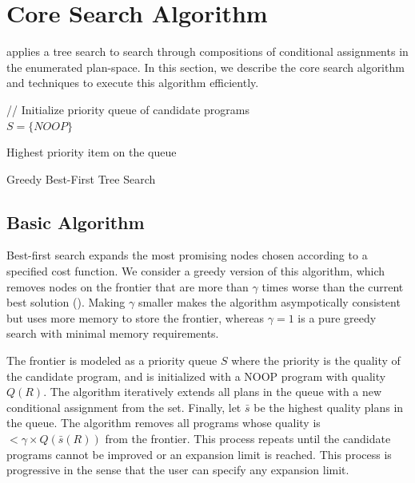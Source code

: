 \section{Core Search Algorithm}
\sys applies a tree search to search through compositions of conditional assignments in the enumerated plan-space. In this section, we describe the core search algorithm and techniques to execute this algorithm efficiently.

{
\begin{algorithm}[t]

// Initialize priority queue of candidate programs\\
$S = \{NOOP\}$



\Return Highest priority item on the queue
\caption{Greedy Best-First Tree Search}
\label{alg:main}
\end{algorithm}
}

\subsection{Basic Algorithm}
Best-first search expands the most promising nodes chosen according to a specified cost function.
We consider a greedy version of this algorithm, which removes nodes on the frontier that are more than $\gamma$ times worse than the current best solution ().
Making $\gamma$ smaller makes the algorithm asympotically consistent but uses more memory to store the frontier, whereas $\gamma=1$ is a pure greedy search with minimal memory requirements.  

The frontier is modeled as a priority queue $S$ where the priority is the quality of the candidate program, and is initialized with a NOOP program with quality $Q(R)$.  
The algorithm iteratively extends all plans in the queue with a new conditional assignment from the set. 
Finally, let $\bar{s}$ be the highest quality plans in the queue.  The algorithm removes all programs whose quality is $<\gamma\times Q(\bar{s}(R))$ from the frontier.  
This process repeats until the candidate programs cannot be improved or an expansion limit is reached.
This process is progressive in the sense that the user can specify any expansion limit.

